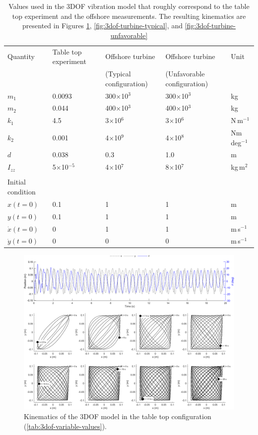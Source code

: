 \documentclass{article}
\begin{document}
\begin{table}
    \centering
    \begin{tabular}{l l l ll }
    \toprule
         Quantity & Table top experiment & Offshore turbine &  Offshore turbine & Unit \\
         & & (Typical configuration) & (Unfavorable configuration)\\
         \midrule
         $m_1$ & 0.0093 & 300$\times$10$^3$ & 300$\times$10$^3$ & kg\\ 
         $m_2$ & 0.044 & 400$\times$10$^3$ & 400$\times$10$^3$ & kg\\ 
         $k_1$ & 4.5 & 3$\times$10$^6$ & 3$\times$10$^6$ & N\,m$^{-1}$ \\ 
         $k_2$ & 0.001 & 4$\times$10$^9$ & 4$\times$10$^8$ & Nm\,deg$^{-1}$ \\ 
         $d$ & 0.038 & 0.3 & 1.0 & m\\ 
         $I_{zz}$ & 5$\times$10$^{-5}$ & 4$\times$10$^7$ & 8$\times$10$^7$ & kg\,m$^2$ \\
         \\
         Initial condition & \\
         \midrule
         $x(t=0)$ & 0.1 & 1 & 1 & m\\ 
         $y(t=0)$ & 0.1 & 1 & 1 & m\\
         $\dot{x}(t=0)$ & 0 & 1 & 1 & m\,s$^{-1}$ \\
         $\dot{y}(t=0)$ & 0 & 0 & 0 & m\,s$^{-1}$ \\
         \bottomrule
    \end{tabular}
    \caption{Values used in the 3DOF vibration model that roughly correspond to the table top experiment and the offshore measurements. The resulting kinematics are presented in Figures \ref{fig:3dof-tabletop}, \ref{fig:3dof-turbine-typical}, and \ref{fig:3dof-turbine-unfavorable}}
    \label{tab:3dof-variable-values}
\end{table}

\begin{figure}
    \centering
    \includegraphics[width=1\textwidth]{figures/tabletop.png}
    \caption{Kinematics of the 3DOF model in the table top configuration (\autoref{tab:3dof-variable-values}).}
    \label{fig:3dof-tabletop}
\end{figure}
\end{document}
